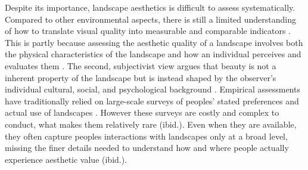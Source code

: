 \documentclass[11pt]{article}
\renewcommand{\_}{\textunderscore\allowbreak{}}
\begin{document}
Despite its importance, landscape aesthetics is difficult to assess systematically. Compared to other environmental aspects, there is still a limited understanding of how to translate visual quality into measurable and comparable indicators \citep{tveit_key_2006}. This is partly because assessing the aesthetic quality of a landscape involves both the physical characteristics of the landscape and how an individual perceives and evaluates them \citep{daniel_whither_2001,zhang_assessment_2022,schirpke_predicting_2013}. The second, subjectivist view argues that beauty is not a inherent property of the landscape but is instead shaped by the observer's individual cultural, social, and psychological background \citep{lothian_landscape_1999}. Empirical assessments have traditionally relied on large-scale surveys of peoples' stated preferences and actual use of landscapes \citep{havinga_social_2021}. However these surveys are costly and complex to conduct, what makes them relatively rare (ibid.). Even when they are available, they often capture peoples interactions with landscapes only at a broad level, missing the finer details needed to understand how and where people actually experience aesthetic value (ibid.).
\end{document}

